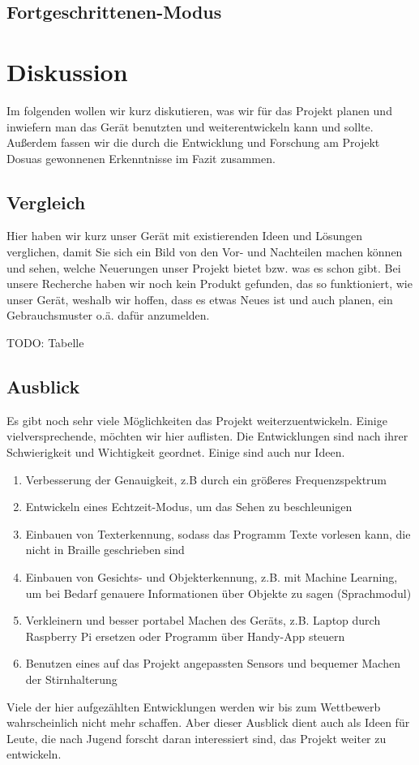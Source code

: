 \documentclass[a4paper,12pt,ngerman]{scrartcl}
\begin{document}
\subsection{Fortgeschrittenen-Modus}



\newpage

\section{Diskussion}

Im folgenden wollen wir kurz diskutieren, was wir für das Projekt planen und inwiefern man das
Gerät benutzten und weiterentwickeln kann und sollte. Außerdem fassen wir die durch die Entwicklung und Forschung am Projekt Dosuas gewonnenen Erkenntnisse im Fazit zusammen.

\subsection{Vergleich}

Hier haben wir kurz unser Gerät mit existierenden Ideen und Lösungen verglichen, damit Sie sich ein Bild von den
Vor- und Nachteilen machen können und sehen, welche Neuerungen unser Projekt bietet bzw. was es schon gibt. Bei unsere
Recherche haben wir noch kein Produkt gefunden, das so funktioniert, wie unser Gerät, weshalb wir hoffen, dass es 
etwas Neues ist und auch planen, ein Gebrauchsmuster o.ä. dafür anzumelden.

TODO: Tabelle 

\subsection{Ausblick}

Es gibt noch sehr viele Möglichkeiten das Projekt weiterzuentwickeln. Einige vielversprechende,
möchten wir hier auflisten. Die Entwicklungen sind nach ihrer Schwierigkeit und Wichtigkeit geordnet. Einige sind auch nur Ideen.
\begin{enumerate}
	\item Verbesserung der Genauigkeit, z.B durch ein größeres Frequenzspektrum
	\item Entwickeln eines Echtzeit-Modus, um das Sehen zu beschleunigen
	\item Einbauen von Texterkennung, sodass das Programm Texte vorlesen kann, die nicht in Braille geschrieben sind
	\item Einbauen von Gesichts- und Objekterkennung, z.B. mit Machine Learning, um bei Bedarf genauere 
	Informationen über Objekte zu sagen (Sprachmodul)
	\item Verkleinern und besser portabel Machen des Geräts, z.B. Laptop durch Raspberry Pi ersetzen oder Programm über
	Handy-App steuern
	\item Benutzen eines auf das Projekt angepassten Sensors und bequemer Machen der Stirnhalterung
\end{enumerate}
Viele der hier aufgezählten Entwicklungen werden wir bis zum Wettbewerb wahrscheinlich nicht 
mehr schaffen. Aber dieser Ausblick dient auch als Ideen für Leute, die nach Jugend forscht 
daran interessiert sind, das Projekt weiter zu entwickeln. 
\end{document}
